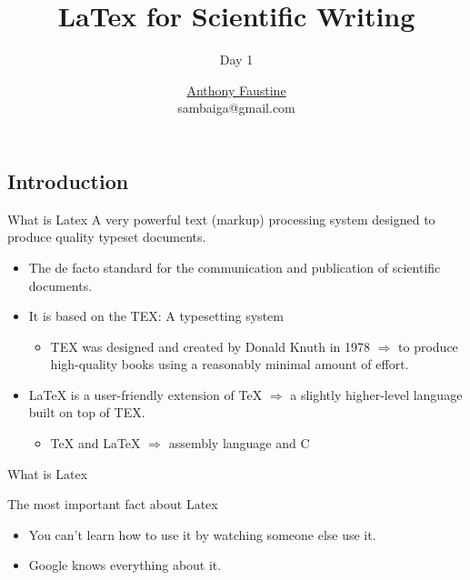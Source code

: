 \documentclass{beamer}
\title{ LaTex for Scientific Writing} %
\subtitle{Day 1} %
\author{\href{sambaiga.github.io}{Anthony Faustine} \\sambaiga@gmail.com}
\begin{document}
  \frame{\maketitle}


  \begin{darkframes}
    
\section{Introduction}
  \begin{frame}[<+->]{What is Latex}
  	A very powerful text (markup) processing system designed to produce quality typeset
  	documents.
  	\begin{itemize}
  		\item The de facto standard for the communication and publication of scientific documents.
  		\item It is based on the TEX: A typesetting system
  		\begin{itemize}
  			\item TEX was designed and created by Donald Knuth in 1978 $\Rightarrow$ to produce high-quality books using a
  			reasonably minimal amount of effort.
  		\end{itemize}
  		\item LaTeX is a user-friendly extension of TeX $\Rightarrow$  a slightly higher-level language built on top of TEX.
  		\begin{itemize}
  			\item TeX and LaTeX $\Rightarrow$ assembly language and C
  		\end{itemize}
  		
  	\end{itemize}
  \end{frame} 

 
   
   \begin{frame}[<+->]{What is Latex}
   	
   	\begin{block}{The most important fact about Latex}
   		\begin{itemize}
   			\item You can’t learn how to use it by watching someone else use it.
   			\item Google knows everything about it.


\end{itemize}
\end{block}
\end{frame}
\end{darkframes}
\end{document}
